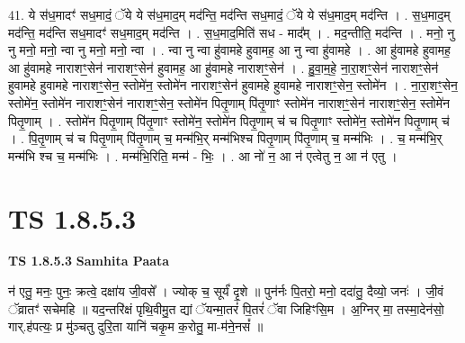 \documentclass[17pt]{extarticle}
\begin{document}
41. ये स॑ध॒मादꣳ॑ सध॒मादं॒ ॅये ये स॑ध॒माद॒म् मद॑न्ति॒ मद॑न्ति सध॒मादं॒ ॅये ये स॑ध॒माद॒म् मद॑न्ति । . स॒ध॒माद॒म् मद॑न्ति॒ मद॑न्ति सध॒मादꣳ॑ सध॒माद॒म् मद॑न्ति । . स॒ध॒माद॒मिति॑ सध - माद᳚म् । . मद॒न्तीति॒ मद॑न्ति । . मनो॒ नु नु मनो॒ मनो॒ न्वा नु मनो॒ मनो॒ न्वा । . न्वा नु न्वा हु॑वामहे हुवामह॒ आ नु न्वा हु॑वामहे । . आ हु॑वामहे हुवामह॒ आ हु॑वामहे नाराशꣳ॒॒सेन॑ नाराशꣳ॒॒सेन॑ हुवामह॒ आ हु॑वामहे नाराशꣳ॒॒सेन॑ । . हु॒वा॒म॒हे॒ ना॒रा॒शꣳ॒॒सेन॑ नाराशꣳ॒॒सेन॑ हुवामहे हुवामहे नाराशꣳ॒॒सेन॒ स्तोमे॑न॒ स्तोमे॑न नाराशꣳ॒॒सेन॑ हुवामहे हुवामहे नाराशꣳ॒॒सेन॒ स्तोमे॑न । . ना॒रा॒शꣳ॒॒सेन॒ स्तोमे॑न॒ स्तोमे॑न नाराशꣳ॒॒सेन॑ नाराशꣳ॒॒सेन॒ स्तोमे॑न पितृ॒णाम् पि॑तृ॒णाꣳ स्तोमे॑न नाराशꣳ॒॒सेन॑ नाराशꣳ॒॒सेन॒ स्तोमे॑न पितृ॒णाम् । . स्तोमे॑न पितृ॒णाम् पि॑तृ॒णाꣳ स्तोमे॑न॒ स्तोमे॑न पितृ॒णाम् च॑ च पितृ॒णाꣳ स्तोमे॑न॒ स्तोमे॑न पितृ॒णाम् च॑ । . पि॒तृ॒णाम् च॑ च पितृ॒णाम् पि॑तृ॒णाम् च॒ मन्म॑भि॒र् मन्म॑भिश्च पितृ॒णाम् पि॑तृ॒णाम् च॒ मन्म॑भिः । . च॒ मन्म॑भि॒र् मन्म॑भि श्च च॒ मन्म॑भिः । . मन्म॑भि॒रिति॒ मन्म॑ - भिः॒ । . आ नो॑ न॒ आ न॑ एत्वेतु न॒ आ न॑ एतु । \newline
\pagebreak
{}

\section{ TS 1.8.5.3 }

\textbf{TS 1.8.5.3 } \newline
\textbf{Samhita Paata} \newline

न॑ एतु॒ मनः॒ पुनः॒ क्रत्वे॒ दक्षा॑य जी॒वसे᳚ । ज्योक् च॒ सूर्यं॑ दृ॒शे ॥ पुन॑र्नः पि॒तरो॒ मनो॒ ददा॑तु॒ दैव्यो॒ जनः॑ । जी॒वं ॅव्रातꣳ॑ सचेमहि ॥ यद॒न्तरि॑क्षं पृथि॒वीमु॒त द्यां ॅयन्मा॒तरं॑ पि॒तरं॑ ॅवा जिहिꣳसि॒म । अ॒ग्निर् मा॒ तस्मा॒देन॑सो॒ गार्.ह॑पत्यः॒ प्र मु॑ञ्चतु दुरि॒ता यानि॑ चकृ॒म क॒रोतु॒ मा-म॑ने॒नसं᳚ ॥ \newline
\end{document}
